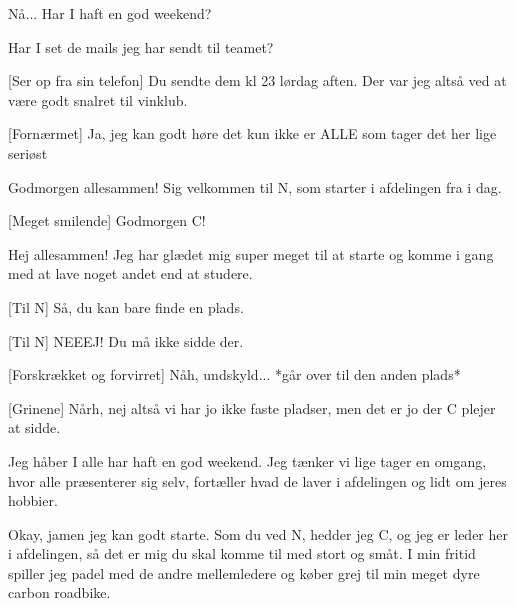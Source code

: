 \documentclass[a4paper,11pt]{article}
\begin{document}
\begin{sketch}

 Nå... Har I haft en god weekend?


 Har I set de mails jeg har sendt til teamet?

[Ser op fra sin telefon] Du sendte dem kl 23 lørdag aften. Der var jeg altså ved at være godt snalret til vinklub. 

[Fornærmet] Ja, jeg kan godt høre det kun ikke er ALLE som tager det her lige seriøst


 Godmorgen allesammen! Sig velkommen til N, som starter i afdelingen fra i dag. 

[Meget smilende] Godmorgen C! 


 Hej allesammen! Jeg har glædet mig super meget til at starte og komme i gang med at lave noget andet end at studere. 


[Til N] Så, du kan bare finde en plads. 


[Til N] NEEEJ! Du må ikke sidde der. 

[Forskrækket og forvirret] Nåh, undskyld... *går over til den anden plads*

[Grinene] Nårh, nej altså vi har jo ikke faste pladser, men det er jo der C plejer at sidde.


 Jeg håber I alle har haft en god weekend. Jeg tænker vi lige tager en omgang, hvor alle præsenterer sig selv, fortæller hvad de laver i afdelingen og lidt om jeres hobbier. 


 Okay, jamen jeg kan godt starte. Som du ved N, hedder jeg C, og jeg er leder her i afdelingen, så det er mig du skal komme til med stort og småt. I min fritid spiller jeg padel med de andre mellemledere og køber grej til min meget dyre carbon roadbike. 


\end{sketch}
\end{document}
